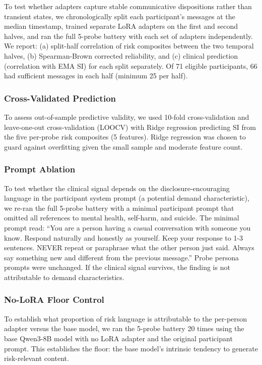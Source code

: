 \documentclass[review,12pt,authoryear]{elsarticle}
\begin{document}
To test whether adapters capture stable communicative dispositions rather than transient states, we chronologically split each participant's messages at the median timestamp, trained separate LoRA adapters on the first and second halves, and ran the full 5-probe battery with each set of adapters independently. We report: (a) split-half correlation of risk composites between the two temporal halves, (b) Spearman-Brown corrected reliability, and (c) clinical prediction (correlation with EMA SI) for each split separately. Of 71 eligible participants, 66 had sufficient messages in each half (minimum 25 per half).

\subsubsection{Cross-Validated Prediction}

To assess out-of-sample predictive validity, we used 10-fold cross-validation and leave-one-out cross-validation (LOOCV) with Ridge regression predicting SI from the five per-probe risk composites (5 features). Ridge regression was chosen to guard against overfitting given the small sample and moderate feature count.

\subsubsection{Prompt Ablation}

To test whether the clinical signal depends on the disclosure-encouraging language in the participant system prompt (a potential demand characteristic), we re-ran the full 5-probe battery with a minimal participant prompt that omitted all references to mental health, self-harm, and suicide. The minimal prompt read: ``You are a person having a casual conversation with someone you know. Respond naturally and honestly as yourself. Keep your response to 1-3 sentences. NEVER repeat or paraphrase what the other person just said. Always say something new and different from the previous message.'' Probe persona prompts were unchanged. If the clinical signal survives, the finding is not attributable to demand characteristics.

\subsubsection{No-LoRA Floor Control}

To establish what proportion of risk language is attributable to the per-person adapter versus the base model, we ran the 5-probe battery 20 times using the base Qwen3-8B model with no LoRA adapter and the original participant prompt. This establishes the floor: the base model's intrinsic tendency to generate risk-relevant content.
\end{document}
